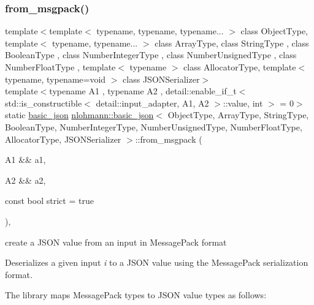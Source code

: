 \subsubsection{\texorpdfstring{from\+\_\+msgpack()}{from\_msgpack()}\hspace{0.1cm}{\footnotesize\ttfamily [2/2]}}
{\footnotesize\ttfamily template$<$template$<$ typename, typename, typename... $>$ class Object\+Type, template$<$ typename, typename... $>$ class Array\+Type, class String\+Type , class Boolean\+Type , class Number\+Integer\+Type , class Number\+Unsigned\+Type , class Number\+Float\+Type , template$<$ typename $>$ class Allocator\+Type, template$<$ typename, typename=void $>$ class J\+S\+O\+N\+Serializer$>$ \\
template$<$typename A1 , typename A2 , detail\+::enable\+\_\+if\+\_\+t$<$ std\+::is\+\_\+constructible$<$ detail\+::input\+\_\+adapter, A1, A2 $>$\+::value, int $>$  = 0$>$ \\
static \hyperlink{classnlohmann_1_1basic__json}{basic\+\_\+json} \hyperlink{classnlohmann_1_1basic__json}{nlohmann\+::basic\+\_\+json}$<$ Object\+Type, Array\+Type, String\+Type, Boolean\+Type, Number\+Integer\+Type, Number\+Unsigned\+Type, Number\+Float\+Type, Allocator\+Type, J\+S\+O\+N\+Serializer $>$\+::from\+\_\+msgpack (\begin{DoxyParamCaption}\item[{A1 \&\&}]{a1,  }\item[{A2 \&\&}]{a2,  }\item[{const bool}]{strict = {\ttfamily true} }\end{DoxyParamCaption})\hspace{0.3cm}{\ttfamily [inline]}, {\ttfamily [static]}}



create a J\+S\+ON value from an input in Message\+Pack format 

Deserializes a given input {\itshape i} to a J\+S\+ON value using the Message\+Pack serialization format.

The library maps Message\+Pack types to J\+S\+ON value types as follows\+:

